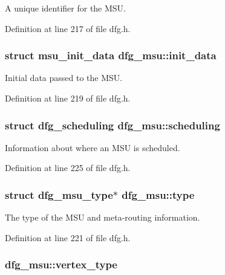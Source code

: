A unique identifier for the M\-S\-U. 



Definition at line 217 of file dfg.\-h.

\hypertarget{structdfg__msu_ae1af580efcec56f0840d058069f5a208}{
\subsubsection[{init\-\_\-data}]{\setlength{\rightskip}{0pt plus 5cm}struct {\bf msu\-\_\-init\-\_\-data} dfg\-\_\-msu\-::init\-\_\-data}}\label{structdfg__msu_ae1af580efcec56f0840d058069f5a208}


Initial data passed to the M\-S\-U. 



Definition at line 219 of file dfg.\-h.

\hypertarget{structdfg__msu_a4ca8d344a0d4c4cf72b8a045eb3d3d61}{
\subsubsection[{scheduling}]{\setlength{\rightskip}{0pt plus 5cm}struct {\bf dfg\-\_\-scheduling} dfg\-\_\-msu\-::scheduling}}\label{structdfg__msu_a4ca8d344a0d4c4cf72b8a045eb3d3d61}


Information about where an M\-S\-U is scheduled. 



Definition at line 225 of file dfg.\-h.

\hypertarget{structdfg__msu_aecd16205ea67b3a51ad5df742ddc2778}{
\subsubsection[{type}]{\setlength{\rightskip}{0pt plus 5cm}struct {\bf dfg\-\_\-msu\-\_\-type}$\ast$ dfg\-\_\-msu\-::type}}\label{structdfg__msu_aecd16205ea67b3a51ad5df742ddc2778}


The type of the M\-S\-U and meta-\/routing information. 



Definition at line 221 of file dfg.\-h.

\hypertarget{structdfg__msu_a2b64c45188762a61c6ab906f7f1fccdd}{
\subsubsection[{vertex\-\_\-type}]{ dfg\-\_\-msu\-::vertex\-\_\-type}}\label{structdfg__msu_a2b64c45188762a61c6ab906f7f1fccdd}



